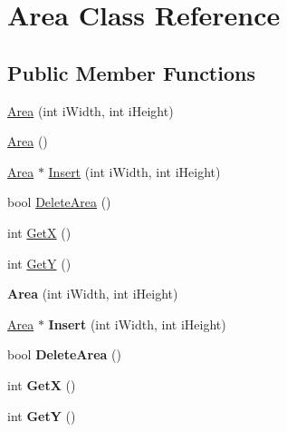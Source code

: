 \hypertarget{class_area}{\section{Area Class Reference}
\label{class_area}
}
\subsection*{Public Member Functions}
\begin{DoxyCompactItemize}
\item 
\hyperlink{class_area_ae3b601a8672caa012bda2e2405733747}{Area} (int i\+Width, int i\+Height)
\item 
\hyperlink{class_area_aa92851fcffb0a9f1c6c8c283204f7003}{Area} ()
\item 
\hyperlink{class_area}{Area} $\ast$ \hyperlink{class_area_a8d2e0a56ceeea87b3ed19078e2290257}{Insert} (int i\+Width, int i\+Height)
\item 
bool \hyperlink{class_area_afd9b2b33f83d3cb779803e750a2486c9}{Delete\+Area} ()
\item 
int \hyperlink{class_area_a8fc649abc6d4f89ddec46e18b53d66c4}{Get\+X} ()
\item 
int \hyperlink{class_area_ae6b8a865cd455c5005f1af0b74191cf7}{Get\+Y} ()
\item 
\hypertarget{class_area_ae3b601a8672caa012bda2e2405733747}{{\bfseries Area} (int i\+Width, int i\+Height)}\label{class_area_ae3b601a8672caa012bda2e2405733747}

\item 
\hypertarget{class_area_ab5a89896a666c16d18e3de43906e2db6}{\hyperlink{class_area}{Area} $\ast$ {\bfseries Insert} (int i\+Width, int i\+Height)}\label{class_area_ab5a89896a666c16d18e3de43906e2db6}

\item 
\hypertarget{class_area_afd9b2b33f83d3cb779803e750a2486c9}{bool {\bfseries Delete\+Area} ()}\label{class_area_afd9b2b33f83d3cb779803e750a2486c9}

\item 
\hypertarget{class_area_a8fc649abc6d4f89ddec46e18b53d66c4}{int {\bfseries Get\+X} ()}\label{class_area_a8fc649abc6d4f89ddec46e18b53d66c4}

\item 
\hypertarget{class_area_ae6b8a865cd455c5005f1af0b74191cf7}{int {\bfseries Get\+Y} ()}\label{class_area_ae6b8a865cd455c5005f1af0b74191cf7}

\end{DoxyCompactItemize}



